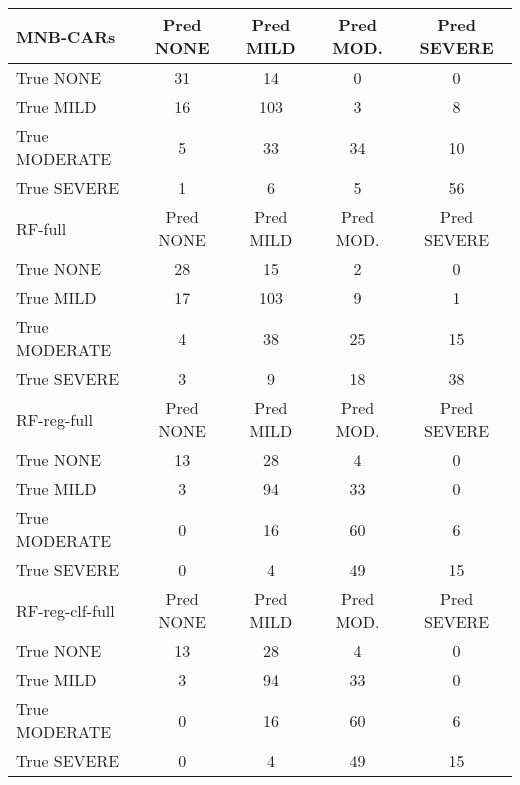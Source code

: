{\renewcommand{\arraystretch}{0.75}%
\begin{table}[]
    \centering
    \begin{tabular}{|l|c|c|c|c|}
             \hline
   \cellcolor{gray!15} \textsf{MNB-CARs} & \textsf{Pred NONE} & \textsf{Pred MILD} & \textsf{Pred MOD.} & \textsf{Pred SEVERE} \\
   \hline
   \textsf{True NONE} & \cellcolor{gray!15} 31 & 14 & 0 & 0 \\
   \textsf{True MILD} & 16 & \cellcolor{gray!15} 103 & 3 & 8 \\
   \textsf{True MODERATE} & 5 & 33 & \cellcolor{gray!15} 34 & 10 \\
   \textsf{True SEVERE} & 1 & 6 & 5 & \cellcolor{gray!15} 56 \\
   \hline
   \cellcolor{gray!15} \textsf{RF-full} & \textsf{Pred NONE} & \textsf{Pred MILD} & \textsf{Pred MOD.} & \textsf{Pred SEVERE} \\
   \hline
   \textsf{True NONE} & \cellcolor{gray!15} 28 & 15 & 2 & 0 \\
   \textsf{True MILD} & 17 & \cellcolor{gray!15} 103 & 9 & 1 \\
   \textsf{True MODERATE} & 4 & 38 & \cellcolor{gray!15} 25 & 15 \\
   \textsf{True SEVERE} & 3 & 9 & 18 & \cellcolor{gray!15} 38 \\
   \hline
   \cellcolor{gray!15} \textsf{RF-reg-full} & \textsf{Pred NONE} & \textsf{Pred MILD} & \textsf{Pred MOD.} & \textsf{Pred SEVERE} \\
   \hline
   \textsf{True NONE} & \cellcolor{gray!15} 13 & 28 & 4 & 0 \\
   \textsf{True MILD} & 3 & \cellcolor{gray!15} 94 & 33 & 0 \\
   \textsf{True MODERATE} & 0 & 16 & \cellcolor{gray!15} 60 & 6 \\
   \textsf{True SEVERE} & 0 & 4 & 49 & \cellcolor{gray!15} 15 \\
   \hline
   \cellcolor{gray!15} \textsf{RF-reg-clf-full} & \textsf{Pred NONE} & \textsf{Pred MILD} & \textsf{Pred MOD.} & \textsf{Pred SEVERE} \\
   \hline
   \textsf{True NONE} & \cellcolor{gray!15} 13 & 28 & 4 & 0 \\
   \textsf{True MILD} & 3 & \cellcolor{gray!15} 94 & 33 & 0 \\
   \textsf{True MODERATE} & 0 & 16 & \cellcolor{gray!15} 60 & 6 \\
   \textsf{True SEVERE} & 0 & 4 & 49 & \cellcolor{gray!15} 15 \\

\end{tabular}
\end{table}}
